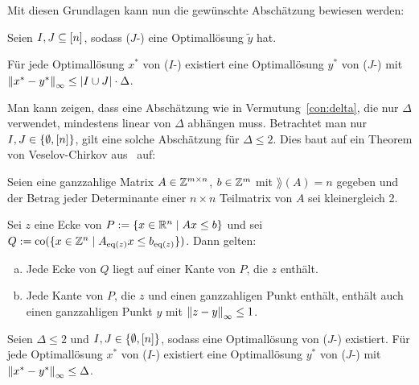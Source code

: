 Mit diesen Grundlagen kann nun die gewünschte Abschätzung bewiesen werden:

\renewcommand{\thetheorem}{2.11}
\begin{theorem}\label{thm:theo2}
	Seien $I,J\subseteq[n]$, sodass ($J$-\MIPI) eine Optimallösung $\tilde{y}$ hat.
	
	Für jede Optimallösung $x^*$ von ($I$-\MIPI) existiert eine Optimallösung $y^*$ von ($J$-\MIPI) mit $\left\lVert x^*-y^*\right\rVert_\infty\leq\lvert I\cup J \rvert\cdot\Delta$.
\end{theorem}

Man kann zeigen, dass eine Abschätzung wie in Vermutung~\ref{con:delta}, die nur $\Delta$ verwendet, mindestens linear von $\Delta$ abhängen muss.
Betrachtet man nur $I,J\in\{\emptyset, [n] \}$, gilt eine solche Abschätzung für $\Delta\leq 2$.
Dies baut auf ein Theorem von Veselov-Chirkov aus~\cite[Theorem 2 und Beweis]{VESELOV2009220} auf:
\begin{lemma}\label{lem:veselov}
	Seien eine ganzzahlige Matrix $A\in\mathbb{Z}^{m\times n}$, $b\in\mathbb{Z}^m$ mit $\rang(A)=n$ gegeben und der Betrag jeder Determinante einer $n\times n$ Teilmatrix von $A$ sei kleinergleich 2.
	
	Sei $z$ eine Ecke von $P:=\{x\in\mathbb{R}^n\mid Ax\leq b \}$ und sei $Q:=\operatorname{co}(\{x\in\mathbb{Z}^n \mid A_{\operatorname{eq}(z)}x \leq b_{\operatorname{eq}(z)} \})$.
	Dann gelten:
	\begin{enumerate}[(a)]
		\item Jede Ecke von $Q$ liegt auf einer Kante von $P$, die $z$ enthält.
		\item Jede Kante von $P$, die $z$ und einen ganzzahligen Punkt enthält, enthält auch einen ganzzahligen Punkt $y$ mit $\left\lVert z -y\right\rVert_\infty\leq 1$.
	\end{enumerate}
\end{lemma}

\begin{theorem}
	Seien $\Delta\leq 2$ und $I,J\in\{\emptyset,[n]\}$, sodass eine Optimallösung von \mbox{($J$-\MIPI)} existiert.
	Für jede Optimallösung $x^*$ von ($I$-\MIPI) existiert eine Optimallösung $y^*$ von ($J$-\MIPI) mit $\left\lVert x^*-y^*\right\rVert_\infty\leq \Delta$.
\end{theorem}
